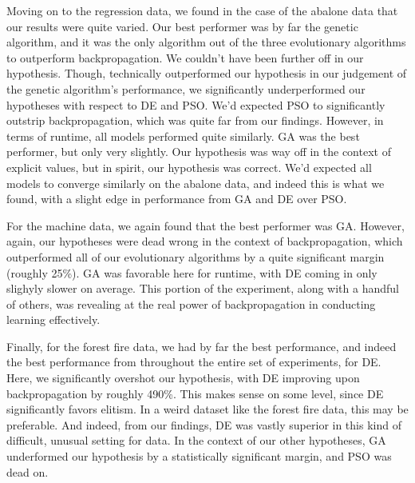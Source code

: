 \documentclass[twoside,11pt]{article}
\begin{document}
Moving on to the regression data, we found in the case of the abalone data that our results
were quite varied. Our best performer was by far the genetic algorithm, and it was the only
algorithm out of the three evolutionary algorithms to outperform backpropagation. We couldn't
have been further off in our hypothesis. Though, technically outperformed our hypothesis
in our judgement of the genetic algorithm's performance, we significantly underperformed
our hypotheses with respect to DE and PSO. We'd expected PSO to significantly outstrip
backpropagation, which was quite far from our findings. However, in terms of runtime, 
all models performed quite similarly. GA was the best performer, but only very slightly.
Our hypothesis was way off in the context of explicit values, but in spirit, our hypothesis
was correct. We'd expected all models to converge similarly on the abalone data, and indeed
this is what we found, with a slight edge in performance from GA and DE over PSO.

For the machine data, we again found that the best performer was GA. However, again, our
hypotheses were dead wrong in the context of backpropagation, which outperformed all of 
our evolutionary algorithms by a quite significant margin (roughly 25\%). GA was favorable
here for runtime, with DE coming in only slighyly slower on average. This portion of the
experiment, along with a handful of others, was revealing at the real power of backpropagation
in conducting learning effectively.

Finally, for the forest fire data, we had by far the best performance, and indeed the best
performance from throughout the entire set of experiments, for DE. Here, we significantly
overshot our hypothesis, with DE improving upon backpropagation by roughly 490\%. This makes
sense on some level, since DE significantly favors elitism. In a weird dataset like the
forest fire data, this may be preferable. And indeed, from our findings, DE was vastly superior
in this kind of difficult, unusual setting for data. In the context of our other hypotheses,
GA underformed our hypothesis by a statistically significant margin, and PSO was dead on.
\end{document}
